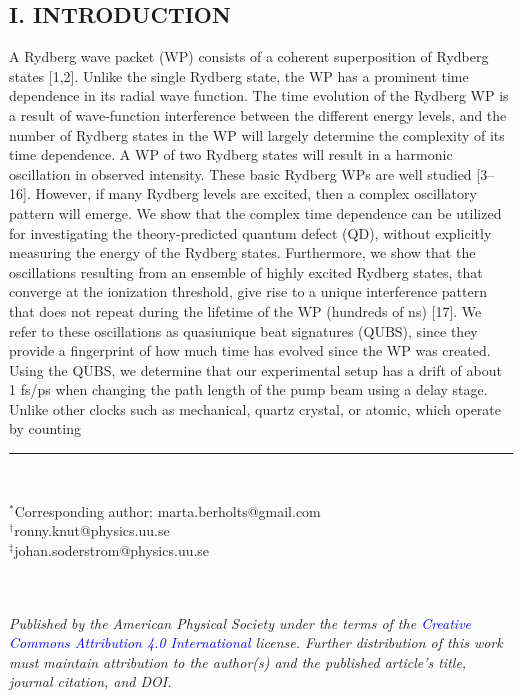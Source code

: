 \documentclass[7pt]{article}
\begin{document}
\begin{multicols}{2}
\small{}
\begin{center}
    \section*{\normalsize{I. INTRODUCTION}}
\end{center}
A Rydberg wave packet (WP) consists of a coherent superposition of Rydberg states [1,2]. Unlike the single Rydberg state, the WP has a prominent time dependence in its radial wave function. The time evolution of the Rydberg WP is a result of wave-function interference between the different energy levels, and the number of Rydberg states in the WP will largely determine the complexity of its time dependence.
A WP of two Rydberg states will result in a harmonic oscillation in observed intensity. These basic Rydberg WPs are well studied [3–16]. However, if many Rydberg levels are excited, then a complex oscillatory pattern will emerge. We show that the complex time dependence can be utilized for investigating the theory-predicted quantum defect (QD), without explicitly measuring the energy of the Rydberg states. Furthermore, we show that the oscillations resulting from an ensemble of highly excited Rydberg states, that converge at the ionization threshold, give rise to a unique interference pattern that does not repeat during the lifetime of the WP (hundreds of ns) [17]. 
We refer to these oscillations as quasiunique beat signatures (QUBS), since they provide a fingerprint of how much time has evolved since the WP was created. Using the QUBS, we determine that our experimental setup has a drift of about 1 fs/ps when changing the path length of the pump beam using a delay stage. Unlike other clocks such as mechanical, quartz crystal, or atomic, which operate by counting\\
\rule{20mm}{0.1mm}\\

    \begin{minipage}{7cm}
    \footnotesize{
        $^*$Corresponding author: marta.berholts@gmail.com\\
        $^{\dag}$ronny.knut@physics.uu.se\\
        $^{\ddagger}$johan.soderstrom@physics.uu.se}
    \end{minipage}\\ \\


\footnotesize{\textit{Published by the American Physical Society under the terms of the \textcolor{Blue}{Creative Commons Attribution 4.0 International} license. Further distribution of this work must maintain attribution to the author(s) and the published article’s title, journal citation, and DOI.}  }
 \\


\end{multicols}
\end{document}
